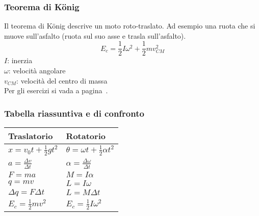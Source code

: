 \subsubsection{Teorema di König}
Il teorema di König descrive un moto roto-traslato. Ad esempio una ruota che si muove sull'asfalto
(ruota sul suo asse e trasla sull'asfalto).
\begin{equation*}
  E_c = \frac{1}{2} I\omega^2 + \frac{1}{2}mv_{CM}^2
\end{equation*}
$I$: inerzia\\
$\omega$: velocità angolare\\
$v_{CM}$: velocità del centro di massa\\[\baselineskip]
Per gli esercizi si vada a pagina~\pageref{ex:inerzia}.

\subsubsection{Tabella riassuntiva e di confronto}
\begin{center}
 \begin{tabular}{M{3cm} M{3cm}}
    \textbf{Traslatorio} & \textbf{Rotatorio}\\\hline
    $x=v_0t+\frac{1}{2}gt^2$ & $\theta=\omega t+\frac{1}{2}\alpha t^2$\\\hline
    $a=\frac{\Delta v}{\Delta t}$ & $\alpha=\frac{\Delta\omega}{\Delta t}$\\\hline
    $F=ma$ & $M=I\alpha$\\\hline
    $q=mv$ & $L=I\omega$\\\hline
    $\Delta q=F\Delta t$ & $L = M\Delta t$\\\hline
    $E_c=\frac{1}{2}mv^2$ & $E_c=\frac{1}{2}I\omega^2$
  \end{tabular} 
\end{center}
